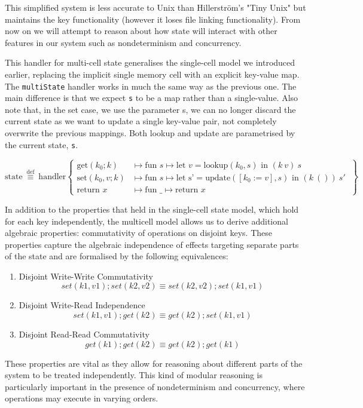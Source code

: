 \documentclass[logo,bsc,singlespacing,parskip]{infthesis}
\begin{document}
This simplified system is less accurate to Unix than Hillerström's "Tiny Unix" but maintains the key functionality (however it loses file linking functionality). From now on we will attempt to reason about how state will interact with other features in our system such as nondeterminism and concurrency. 

This handler for multi-cell state generalises the single-cell model we introduced earlier, replacing the implicit single memory cell with an explicit key-value map. The \lstinline{multiState} handler works in much the same way as the previous one. The main difference is that we expect \lstinline{s} to be a map rather than a single-value. Also note that, in the set case, we use the parameter s, we can no longer discard the current state as we want to update a single key-value pair, not completely overwrite the previous mappings. Both lookup and update are parametrised by the current state, \lstinline{s}.

\[
\text{state} \ \overset{\text{def}}{\equiv} \ \text{handler} \left\{
\begin{array}{ll}
\text{get}(k_0; k) &\mapsto \text{fun } s \mapsto \text{let } v = \text{lookup}(k_0, s) \text{ in } (k\ v)\ s \\
\text{set}(k_0, v; k) &\mapsto \text{fun } s \mapsto \text{let s'} = \text{update}([k_0:=v],s) \text{ in } (k\ ())\ s'\ \\
\text{return } x &\mapsto \text{fun } \_ \mapsto \text{return } x
\end{array}
\right\}
\]


In addition to the properties that held in the single-cell state model, which hold for each key independently, the multicell model allows us to derive additional algebraic properties: commutativity of operations on disjoint keys. These properties capture the algebraic independence of effects targeting separate parts of the state and are formalised by the following equivalences:
\begin{enumerate}
    \item Disjoint Write-Write Commutativity
    \[set(k1,v1);set(k2,v2) \equiv set(k2,v2);set(k1,v1)\] 
    \item Disjoint Write-Read Independence
        \[set(k1,v1);get(k2) \equiv get(k2);set(k1,v1)\] 
    \item Disjoint Read-Read Commutativity
        \[get(k1);get(k2) \equiv get(k2);get(k1)\] 
\end{enumerate}

These properties are vital as they allow for reasoning about different parts of the system to be treated independently. This kind of modular reasoning is particularly important in the presence of nondeterminism and concurrency, where operations may execute in varying orders.
\end{document}
